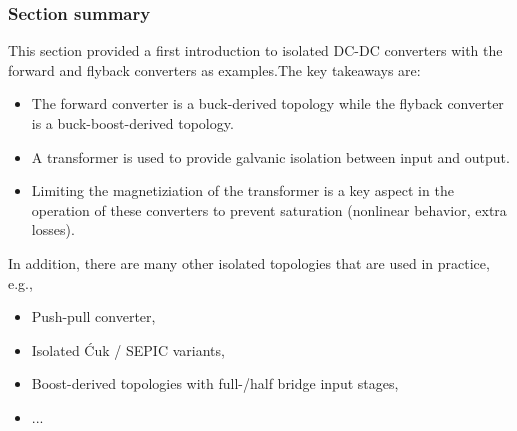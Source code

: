 \begin{frame}
    \frametitle{Section summary}
    This section provided a first introduction to isolated DC-DC converters with the forward and flyback converters as examples.\pause The key takeaways are:
    \begin{itemize}
        \item The forward converter is a buck-derived topology while the flyback converter is a buck-boost-derived topology.\pause
        \item A transformer is used to provide galvanic isolation between input and output.\pause
        \item Limiting the magnetiziation of the transformer is a key aspect in the operation of these converters to prevent saturation (nonlinear behavior, extra losses).
    \end{itemize}\pause
    In addition, there are many other isolated topologies that are used in practice, e.g., 
    \begin{itemize}
        \item Push-pull converter,
        \item Isolated Ćuk / SEPIC variants, 
        \item Boost-derived topologies with full-/half bridge input stages,
        \item ...
    \end{itemize}
\end{frame}